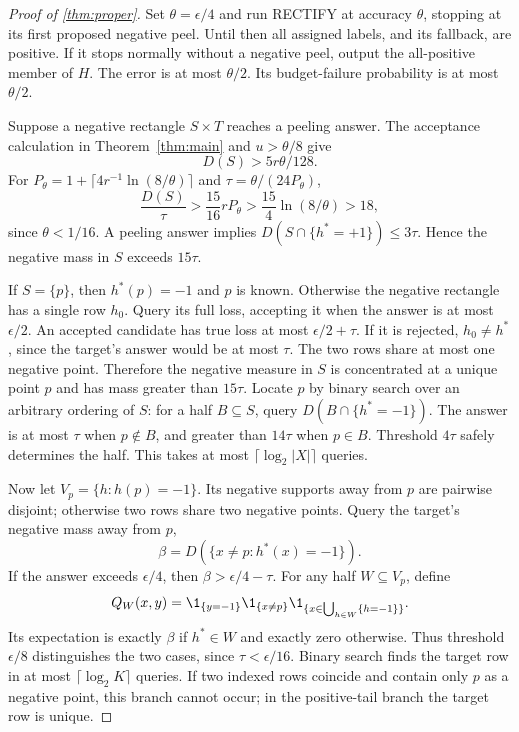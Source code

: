 \begin{proof}[Proof of \cref{thm:proper}]
Set $\theta=\epsilon/4$ and run RECTIFY at accuracy $\theta$, stopping at its first proposed negative peel. Until then all assigned labels, and its fallback, are positive. If it stops normally without a negative peel, output the all-positive member of $H$. The error is at most $\theta/2$. Its budget-failure probability is at most $\theta/2$.

Suppose a negative rectangle $S\times T$ reaches a peeling answer. The acceptance calculation in Theorem~\ref{thm:main} and $u>\theta/8$ give
\[
 D(S)>5r\theta/128.
\]
For $P_\theta=1+\lceil4r^{-1}\ln(8/\theta)\rceil$ and $\tau=\theta/(24P_\theta)$,
\[
 \frac{D(S)}\tau>\frac{15}{16}rP_\theta
 >\frac{15}{4}\ln(8/\theta)>18,
\]
since $\theta<1/16$. A peeling answer implies $D(S\cap\{h^*=+1\})\le3\tau$. Hence the negative mass in $S$ exceeds $15\tau$.

If $S=\{p\}$, then $h^*(p)=-1$ and $p$ is known. Otherwise the negative rectangle has a single row $h_0$. Query its full loss, accepting it when the answer is at most $\epsilon/2$. An accepted candidate has true loss at most $\epsilon/2+\tau$. If it is rejected, $h_0\ne h^*$, since the target's answer would be at most $\tau$. The two rows share at most one negative point. Therefore the negative measure in $S$ is concentrated at a unique point $p$ and has mass greater than $15\tau$. Locate $p$ by binary search over an arbitrary ordering of $S$: for a half $B\subseteq S$, query $D(B\cap\{h^*=-1\})$. The answer is at most $\tau$ when $p\notin B$, and greater than $14\tau$ when $p\in B$. Threshold $4\tau$ safely determines the half. This takes at most $\lceil\log_2|X|\rceil$ queries.

Now let $V_p=\{h:h(p)=-1\}$. Its negative supports away from $p$ are pairwise disjoint; otherwise two rows share two negative points. Query the target's negative mass away from $p$,
\[
 \beta=D(\{x\ne p:h^*(x)=-1\}).
\]
If the answer exceeds $\epsilon/4$, then $\beta>\epsilon/4-\tau$. For any half $W\subseteq V_p$, define
\[
 Q_W(x,y)=\1_{\{y=-1\}}\1_{\{x\ne p\}}
 \1_{\{x\in\bigcup_{h\in W}\{h=-1\}\}}.
\]
Its expectation is exactly $\beta$ if $h^*\in W$ and exactly zero otherwise. Thus threshold $\epsilon/8$ distinguishes the two cases, since $\tau<\epsilon/16$. Binary search finds the target row in at most $\lceil\log_2K\rceil$ queries. If two indexed rows coincide and contain only $p$ as a negative point, this branch cannot occur; in the positive-tail branch the target row is unique.


\end{proof}
